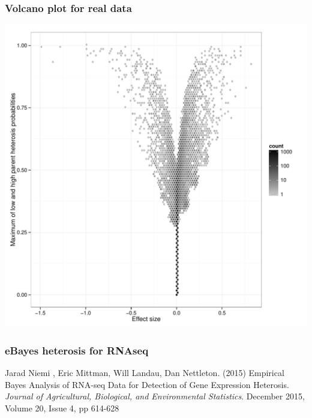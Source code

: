 \documentclass[handout]{beamer}\usepackage[]{graphicx}\usepackage[]{color}
\begin{document}
\begin{frame}
\frametitle{Volcano plot for real data}
\begin{center}
\includegraphics{volcano}
\end{center}
\end{frame}


\begin{frame}
\frametitle{eBayes heterosis for RNAseq}

Jarad Niemi , Eric Mittman, Will Landau, Dan Nettleton. (2015) Empirical Bayes Analysis of RNA-seq Data for Detection of Gene Expression Heterosis. \emph{Journal of Agricultural, Biological, and Environmental Statistics}. December 2015, Volume 20, Issue 4, pp 614-628

\end{frame}
\end{document}
